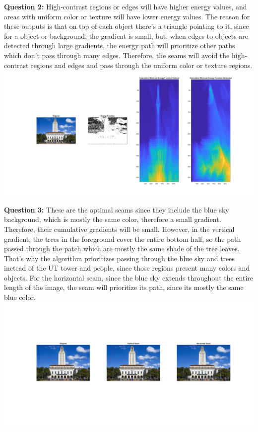 \documentclass[11pt]{article}
\begin{document}
    \textbf{Question 2:}\newline
    High-contrast regions or edges will have higher energy values, and areas with uniform color or texture will have lower energy values.
    The reason for these outputs is that on top of each object there's a
    triangle pointing to it, since for a object or background, the gradient
    is small, but, when edges to objects are detected through large
    gradients, the energy path will prioritize other paths which don't pass
    through many edges. Therefore, the seams will avoid the high-contrast regions and edges and pass through the uniform color or texture regions.\newline
    \includegraphics[width=\linewidth]{Part 2 Pictures/question2}\newline

    \textbf{Question 3:}\newline
    These are the optimal seams since they include the blue sky background,
    which is mostly the same color, therefore a small gradient. Therefore, their cumulative gradients will
    be small. However, in the vertical gradient, the trees in the foreground
    cover the entire bottom half, so the path passed through the patch which
    are mostly the same shade of the tree leaves. That's why the algorithm prioritizes passing through the blue sky and trees inctead of the UT
    tower and people, since those regions present many colors and objects. For the horizontal seam, since the blue sky extends throughout the
    entire length of the image, the seam will prioritize its path, since its mostly the same blue color.\newline
    \includegraphics[width=\linewidth]{Part 2 Pictures/question3}\newline
\end{document}
